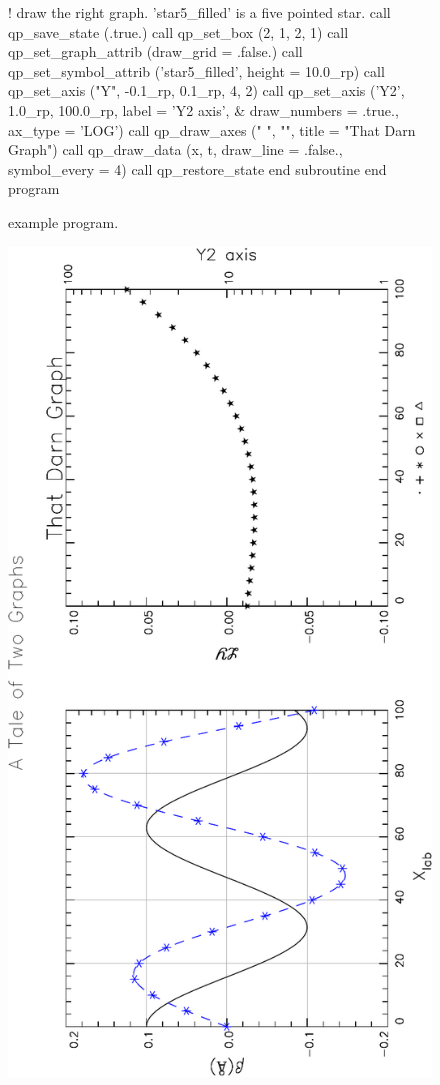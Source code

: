 \begin{figure}
\begin{listing}{1}
    ! draw the right graph. 'star5_filled' is a five pointed star.
    call qp_save_state (.true.)
    call qp_set_box (2, 1, 2, 1)
    call qp_set_graph_attrib (draw_grid = .false.)
    call qp_set_symbol_attrib ('star5_filled', height = 10.0_rp)
    call qp_set_axis ("Y", -0.1_rp, 0.1_rp, 4, 2)
    call qp_set_axis ('Y2', 1.0_rp, 100.0_rp, label = 'Y2 axis', &
                                draw_numbers = .true., ax_type = 'LOG')
    call qp_draw_axes ("      ", "\fsLY\fn", title = "That Darn Graph")
    call qp_draw_data (x, t, draw_line = .false., symbol_every = 4)
    call qp_restore_state
  end subroutine
  end program
\end{listing}
\caption{\quickplot example program.}
\label{f:plot.example}
\end{figure}


\begin{figure}
\centering
\includegraphics[angle=-90,width=5.5in]{plot-example.pdf}

\end{figure}
